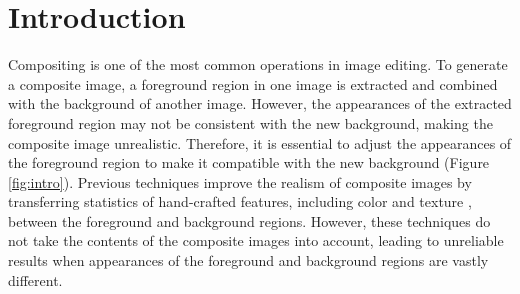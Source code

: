 \documentclass[10pt,twocolumn,letterpaper]{article}
\begin{document}
\section{Introduction}
%
Compositing is one of the most common operations in image editing. To generate a composite image, a foreground region in one image is extracted and combined with the background of another image.
%
However, the appearances of the extracted foreground region may not be consistent with the new background, making the composite image unrealistic.
%
Therefore, it is essential to adjust the appearances of the foreground region to make it compatible with the new background (Figure \ref{fig:intro}).
%
Previous techniques improve the realism of composite images by transferring statistics of hand-crafted features, including color \cite{Lalonde_ICCV_2007, Xue_siggraph_2012} and texture \cite{Sunkavalli_siggraph_2010}, between the foreground and background regions.
%
However, these techniques do not take the contents of the composite images into account, leading to unreliable results when appearances of the foreground and background regions are vastly different.

%
\end{document}

